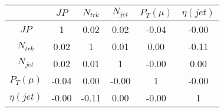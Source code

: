 \begin{tabular}{|c|c|c|c|c|c|} 
\hline
 & $JP$ & $N_{trk}$ & $N_{jet}$ & $P_{T} (\mu)$ & $\eta (jet)$ \\ \hline
$JP$ & 1 & 0.02 & 0.02 & -0.04 & -0.00 \\
$N_{trk}$ & 0.02 & 1 & 0.01 & 0.00 & -0.11 \\
$N_{jet}$ & 0.02 & 0.01 & 1 & -0.00 & 0.00 \\
$P_{T} (\mu)$ & -0.04 & 0.00 & -0.00 & 1 & -0.00 \\
$\eta (jet)$ & -0.00 & -0.11 & 0.00 & -0.00 & 1 \\
\hline 
\end{tabular} 


